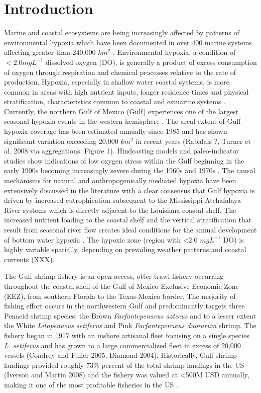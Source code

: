 \documentclass[10pt]{article}
\begin{document}
\section*{Introduction}
Marine and coastal ecosystems are being increasingly affected by patterns of environmental hypoxia which have been documented in over 400 marine systems affecting greater than 240,000 $km^{2}$ \cite{diaz_spreading_2008}.  Environmental hypoxia, a condition of $ <2.0 mg L^{-1} $ dissolved oxygen (DO), is generally a product of excess consumption of oxygen through respiration and chemical processes relative to the rate of production.  Hypoxia, especially in shallow water coastal systems, is more common in areas with high nutrient inputs, longer residence times and physical stratification, characteristics common to coastal and estuarine systems \cite{rabalais_global_2009}.  Currently, the northern Gulf of Mexico (Gulf) experiences one of the largest seasonal hypoxia events in the western hemisphere \cite{rabalais_beyond_2002}.  The areal extent of Gulf hypoxia coverage has been estimated annually since 1985 and has shown significant variation exceeding 20,000 $ km^2 $ in recent years (Rabalais ?, Turner et al. 2008 via aggregations: Figure 1).  Hindcasting models and paleo-indicator studies show indications of low oxygen stress within the Gulf beginning in the early 1900s becoming increasingly severe during the 1960s and 1970s \cite{justic_forecasting_2007, rabalais_sediments_2007, greene_multiple_2009}.  The causal mechanisms for natural and anthropogenically mediated hypoxia have been extensively discussed in the literature \cite{bianchi_science_2010, rabalais_dynamics_2010, zhang_natural_2010} with a clear consensus that Gulf hypoxia is driven by increased eutrophication subsequent to the Mississippi-Atchafalaya River systems which is directly adjacent to the Louisiana coastal shelf.  The increased nutrient loading to the coastal shelf and the vertical stratification that result from seasonal river flow creates ideal conditions for the annual development of bottom water hypoxia \cite{rabalais_beyond_2002, bianchi_science_2010}.  The hypoxic zone (region with \textless 2.0 $ mg{} L^{-1} $ DO) is highly variable spatially, depending on prevailing weather patterns and coastal currents (XXX).

The Gulf shrimp fishery is an open access, otter trawl fishery occurring throughout the coastal shelf of the Gulf of Mexico Exclusive Economic Zone (EEZ), from southern Florida to the Texas-Mexico border.  The majority of fishing effort occurs in the northwestern Gulf and predominantly targets three Penaeid shrimp species: the Brown \textit{Farfantepenaeus aztecus} and to a lesser extent the White \textit{Litopenaeus setiferus} and Pink \textit{Farfantepenaeus duorarum} shrimp.  The fishery began in 1917 with an inshore artisanal fleet focusing on a single species \textit{L. setiferus} and has grown to a large commercialized fleet in excess of 20,000 vessels (Condrey and Fuller 2005, Diamond 2004).  Historically, Gulf shrimp landings provided roughly 73\% percent of the total shrimp landings in the US (Iverson and Martin 2008) and the fishery was valued at \textless 500M USD annually, making it one of the most profitable fisheries in the US \cite{nance_effort_1993, diamond_bycatch_2004}. 
\end{document}
